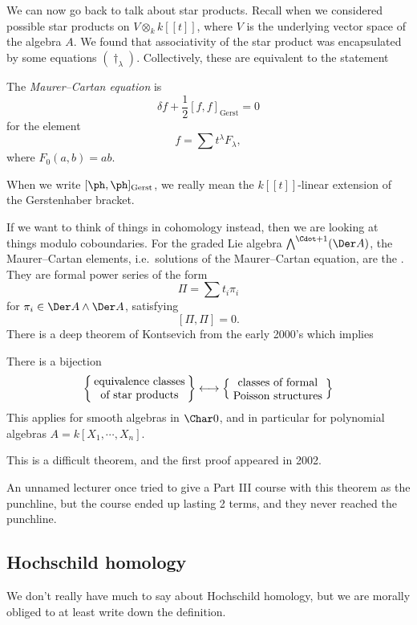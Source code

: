 \documentclass[a4paper]{article}
\begin{document}
We can now go back to talk about star products. Recall when we considered possible star products on $V \otimes_k k[[t]]$, where $V$ is the underlying vector space of the algebra $A$. We found that associativity of the star product was encapsulated by some equations $(\dagger_\lambda)$. Collectively, these are equivalent to the statement
\begin{defi}
  The \emph{Maurer--Cartan equation} is
  \[
    \delta f + \frac{1}{2} [f, f]_{\mathrm{Gerst}} = 0
  \]
  for the element
  \[
    f = \sum t^\lambda F_\lambda,
  \]
  where $F_0(a, b) = ab$.
\end{defi}
When we write $[\ph, \ph]_{\mathrm{Gerst}}$, we really mean the $k[[t]]$-linear extension of the Gerstenhaber bracket.

If we want to think of things in cohomology instead, then we are looking at things modulo coboundaries. For the graded Lie algebra $\bigwedge^{\Cdot + 1}(\Der A)$, the Maurer--Cartan elements, i.e.\ solutions of the Maurer--Cartan equation, are the . They are formal power series of the form
\[
  \Pi = \sum t_i \pi_i
\]
for $\pi_i \in \Der A \wedge \Der A$, satisfying
\[
  [\Pi, \Pi] = 0.
\]
There is a deep theorem of Kontsevich from the early 2000's which implies

\begin{thm}[Kontsevich]
  There is a bijection
  \[
    \left\{\parbox{3cm}{\centering equivalence classes of star products}\right\} \longleftrightarrow \left\{\parbox{3cm}{\centering classes of formal Poisson structures}\right\}
  \]
  This applies for smooth algebras in $\Char 0$, and in particular for polynomial algebras $A = k[X_1, \cdots, X_n]$.
\end{thm}
This is a difficult theorem, and the first proof appeared in 2002.

An unnamed lecturer once tried to give a Part III course with this theorem as the punchline, but the course ended up lasting 2 terms, and they never reached the punchline.

\subsection{Hochschild homology}
We don't really have much to say about Hochschild homology, but we are morally obliged to at least write down the definition.
\end{document}
